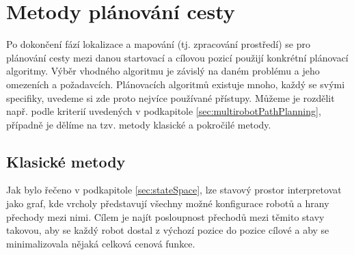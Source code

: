 

\section{Metody plánování cesty}
Po dokončení fází lokalizace a mapování (tj. zpracování prostředí) se pro plánování cesty mezi danou startovací a cílovou pozicí použijí konkrétní plánovací algoritmy. Výběr vhodného algoritmu je závislý na daném problému a jeho omezeních a požadavcích. Plánovacích algoritmů existuje mnoho, každý se svými specifiky, uvedeme si zde proto nejvíce používané přístupy. Můžeme je rozdělit např. podle kriterií uvedených v podkapitole \ref{sec:multirobotPathPlanning}, případně je dělíme na tzv. metody klasické a pokročilé metody.

\subsection{Klasické metody}
Jak bylo řečeno v podkapitole \ref{sec:stateSpace}, lze stavový prostor interpretovat jako graf, kde vrcholy představují všechny možné konfigurace robotů a hrany přechody mezi nimi.
Cílem je najít posloupnost přechodů mezi těmito stavy takovou, aby se každý robot dostal z výchozí pozice do pozice cílové a aby se minimalizovala nějaká celková cenová funkce.

